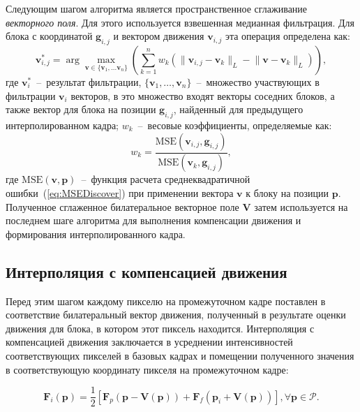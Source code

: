 Следующим шагом алгоритма является пространственное сглаживание \emph{векторного поля}. Для этого используется взвешенная медианная фильтрация. Для блока с координатой $\mathbf{g}_{i,j}$ и вектором движения $\mathbf{v}_{i,j}$ эта операция определена как:
\begin{equation}
\mathbf{v}^*_{i,j} = \arg\max_{\mathbf{v}\in \{\mathbf{v}_1,...\mathbf{v}_n\}}
\left( \sum\limits_{k=1}^{n} w_k ( \lVert\mathbf{v}_{i,j} - \mathbf{v}_k\rVert_L - \lVert\mathbf{v} - \mathbf{v}_k\rVert_L ) \right),
\end{equation}
где $\mathbf{v}^*_i$~--~результат фильтрации, $\{\mathbf{v}_1,\ldots,\mathbf{v}_n\}$~--~множество участвующих в фильтрации $\mathbf{v}_i$ векторов, в это множество входят векторы соседних блоков, а также вектор для блока на позиции $\mathbf{g}_{i,j}$, найденный для предыдущего интерполированном кадра; $w_k$~--~весовые коэффициенты, определяемые как:
\begin{equation}
w_k = \frac{\mathrm{MSE}(\mathbf{v}_{i,j},\mathbf{g}_{i,j})}{\mathrm{MSE}(\mathbf{v}_k,\mathbf{g}_{i,j})},
\end{equation}
где $\mathrm{MSE}(\mathbf{v},\mathbf{p})$~--~функция расчета среднеквадратичной ошибки~(\ref{eq:MSEDiscover}) при применении вектора $\mathbf{v}$ к блоку на позиции $\mathbf{p}$.
Полученное сглаженное билатеральное векторное поле $\mathbf{V}$ затем используется на последнем шаге алгоритма для выполнения компенсации движения и формирования интерполированного кадра.

\subsection{Интерполяция с компенсацией движения}

Перед этим шагом каждому пикселю на промежуточном кадре поставлен в соответствие билатеральный вектор движения, полученный в результате оценки движения для блока, в котором этот пиксель находится. Интерполяция с компенсацией движения заключается в усреднении интенсивностей соответствующих пикселей в базовых кадрах и помещении полученного значения в соответствующую координату пикселя на промежуточном кадре:

\begin{equation}
\mathbf{F}_i(\mathbf{p}) = \frac{1}{2} \left[ \mathbf{F}_p(\mathbf{p}-\mathbf{V}(\mathbf{p})) + \mathbf{F}_f(\mathbf{p}_i+\mathbf{V}(\mathbf{p}))\right], \forall \mathbf{p} \in \mathcal{P}.
\end{equation}

